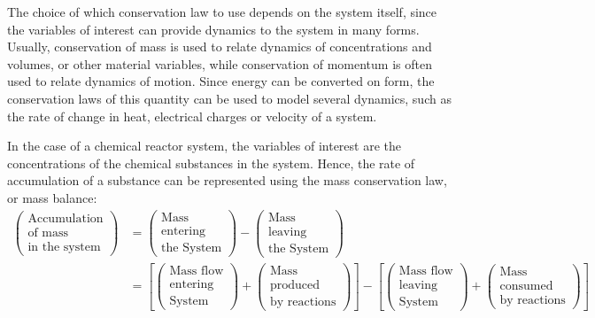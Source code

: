 \documentclass[a4paper,11pt]{book}
\numberwithin{figure}{chapter}
\numberwithin{equation}{chapter}
\numberwithin{table}{chapter}
\theoremstyle{definition}
\begin{document}
The choice of which conservation law to use depends on the system itself, since the variables of interest can provide dynamics to the system in many forms. Usually, conservation of mass is used to relate dynamics of concentrations and volumes, or other material variables, while conservation of momentum is often used to relate dynamics of motion. Since energy can be converted on form, the conservation laws of this quantity can be used to model several dynamics, such as the rate of change in heat, electrical charges or velocity of a system.

In the case of a chemical reactor system, the variables of interest are the concentrations of the chemical substances in the system. Hence, the rate of accumulation of a substance can be represented using the mass conservation law, or mass balance:
\begin{equation} \label{eq:massCons02}
\begin{split}
	\begin{pmatrix}
		\text{Accumulation} \\ \text{of mass} \\ \text{in the system}
	\end{pmatrix} &= 
	\begin{pmatrix}
		\text{Mass} \\ \text{entering} \\ \text{the System}
	\end{pmatrix} - \begin{pmatrix}
		\text{Mass} \\ \text{leaving} \\ \text{the System}
	\end{pmatrix} \\
	&= \left[ \begin{pmatrix}
		\text{Mass flow} \\ \text{entering} \\ \text{System}
	\end{pmatrix} + \begin{pmatrix}
		\text{Mass} \\  \text{produced} \\ \text{by reactions}
	\end{pmatrix} \right] - \left[ \begin{pmatrix}
		\text{Mass flow} \\ \text{leaving} \\ \text{System}
	\end{pmatrix} + \begin{pmatrix}
		\text{Mass} \\ \text{consumed} \\ \text{by reactions}
	\end{pmatrix} \right]
\end{split}
\end{equation}
\end{document}
